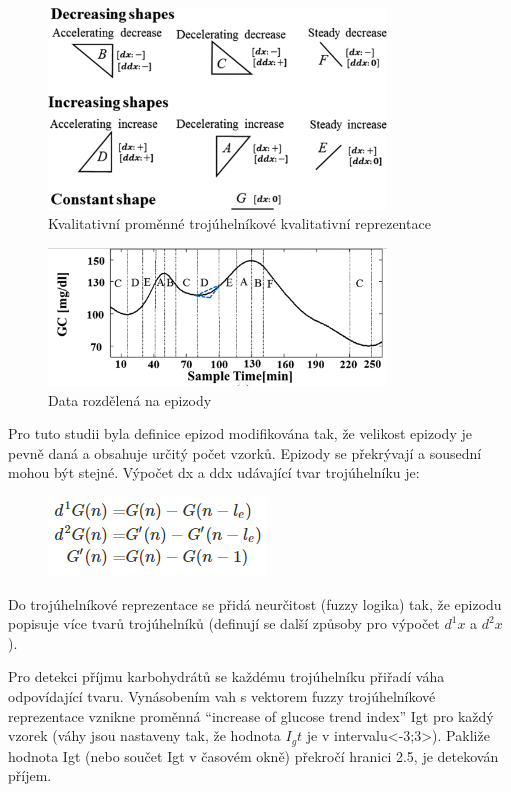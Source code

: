 \begin{figure}[H]
\caption{Kvalitativní proměnné trojúhelníkové kvalitativní reprezentace}
\label{fig:wavelet1}
\centering
\includegraphics[width=0.8\textwidth]{img/analyza/wavelet1.png}
\end{figure}
\begin{figure}[H]
\caption{Data rozdělená na epizody}
\label{fig:wavelet2}
\centering
\includegraphics[width=0.8\textwidth]{img/analyza/wavelet2.png}
\end{figure}

Pro tuto studii byla definice epizod modifikována tak, že velikost epizody je pevně daná a obsahuje určitý počet vzorků. Epizody se překrývají a sousední mohou být stejné. Výpočet dx a ddx udávající tvar trojúhelníku je:

\begin{figure}[H]
\label{fig:wavelet3}
\includegraphics{img/analyza/wavelet3.png}
\end{figure}

Do trojúhelníkové reprezentace se přidá neurčitost (fuzzy logika) tak, že epizodu popisuje více tvarů trojúhelníků (definují se další způsoby pro výpočet $d^1x$ a $d^2x$).

Pro detekci příjmu karbohydrátů se každému trojúhelníku přiřadí váha odpovídající tvaru. Vynásobením vah s vektorem fuzzy trojúhelníkové reprezentace vznikne proměnná “increase of glucose trend index” Igt pro každý vzorek (váhy jsou nastaveny tak, že hodnota $I_gt$ je v intervalu<-3;3>). Pakliže hodnota Igt (nebo součet Igt v časovém okně) překročí hranici 2.5, je detekován příjem.


